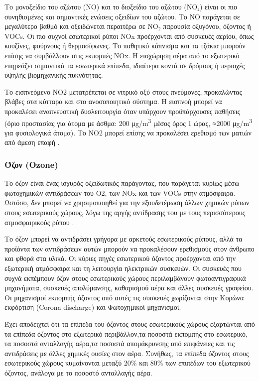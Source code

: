
Το μονοξείδιο του αζώτου (NO) και το διοξείδιο του αζώτου (NO₂) είναι οι πιο συνηθισμένες και σημαντικές ενώσεις οξειδίων του αζώτου. 
Το NO παράγεται σε μεγαλύτερο βαθμό και οξειδώνεται περαιτέρω σε NO₂ παρουσία οξυγόνου, όζοντος ή VOCs.
Οι πιο συχνοί εσωτερικοί  ρύποι NOx προέρχονται από συσκευές αερίου, όπως κουζίνες, φούρνους ή θερμοσίφωνες. 
Το παθητικό κάπνισμα και τα τζάκια μπορούν επίσης να συμβάλλουν στις εκπομπές NOx. 
Η εισχώρηση αέρα από το εξωτερικό επηρεάζει σημαντικά τα εσωτερικά επίπεδα, ιδιαίτερα κοντά σε δρόμους ή περιοχές υψηλής βιομηχανικής πυκνότητας.

Το εισπνεόμενο NO2 μετατρέπεται σε νιτρικό οξύ στους πνεύμονες, προκαλώντας βλάβες στα κύτταρα και στο ανοσοποιητικό σύστημα. 
Η εισπνοή μπορεί να προκαλέσει αναπνευστική δυσλειτουργία όταν υπάρχουν προϋπάρχουσες παθήσεις (όριο προστασίας για άτομα με άσθμα: 200 μg/m\textsuperscript{3} μέσος όρος 1 ώρας, ≈2000 μg/m\textsuperscript{3} για φυσιολογικά άτομα).
 Το NO2 μπορεί επίσης να προκαλέσει ερεθισμό των ματιών από άμεση επαφή \cite{GONZALEZMARTIN2021128376}.


\subsubsection{Όζον (Ozone)}

Το όζον είναι ένας ισχυρός οξειδωτικός παράγοντας, που παράγεται κυρίως μέσω φωτοχημικών αντιδράσεων του O2, των NOx και των VOCs στην ατμόσφαιρα.
 Ωστόσο, δεν μπορεί να χρησιμοποιηθεί για την εξουδετέρωση άλλων χημικών ρύπων στους εσωτερικούς χώρους, λόγω της αργής αντίδρασης του με τους περισσότερους ατμοσφαιρικούς ρύπου \cite{https://doi.org/10.1034/j.1600-0668.2000.010004269.x}.

Το όζον μπορεί να αντιδράσει γρήγορα με αρκετούς εσωτερικούς ρύπους, αλλά τα προϊόντα των αντιδράσεων αυτών μπορούν να προκαλέσουν ερεθισμούς στον άνθρωπο και φθορά στα υλικά.
 Οι κύριες πηγές εσωτερικού όζοντος προέρχονται από την εξωτερική ατμόσφαιρα και τη λειτουργία ηλεκτρικών συσκευών. 
 Οι συσκευές που συχνά εκπέμπουν όζον στους εσωτερικούς χώρους περιλαμβάνουν φωτοαντιγραφικά μηχανήματα, συσκευές απολύμανσης, καθαρισμού αέρα και άλλες συσκευές γραφείου. 
 Οι μηχανισμοί εκπομπής όζοντος από αυτές τις συσκευές χωρίζονται στην Κορώνα εκφόρτιση (Corona discharge) και Φωτοχημικοί μηχανισμοί.

Έχει αποδειχτεί ότι τα επίπεδα του όζοντος στους εσωτερικούς χώρους εξαρτώνται από τα επίπεδα όζοντος στο εξωτερικό περιβάλλον,τα ποσοστά εκπομπής στο εσωτερικό,
τα ποσοστά ανταλλαγής αέρα,τα ποσοστά απομάκρυνσης από επιφάνειες και τις αντιδράσεις με άλλες χημικές ουσίες στον αέρα. Συνήθως, τα επίπεδα όζοντος στους εσωτερικούς χώρους κυμαίνονται μεταξύ 20\% και 80\% των επιπέδων του εξωτερικού όζοντος, 
ανάλογα με το ποσοστό ανταλλαγής αέρα. 

